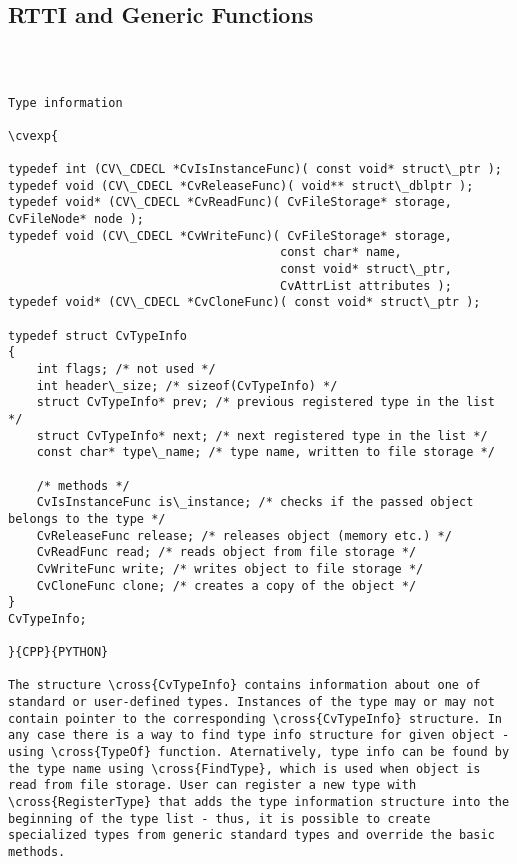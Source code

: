 \subsection{RTTI and Generic Functions}
\begin{verbatim}


\end{verbatim}
\begin{verbatim}

Type information

\cvexp{

typedef int (CV\_CDECL *CvIsInstanceFunc)( const void* struct\_ptr );
typedef void (CV\_CDECL *CvReleaseFunc)( void** struct\_dblptr );
typedef void* (CV\_CDECL *CvReadFunc)( CvFileStorage* storage, CvFileNode* node );
typedef void (CV\_CDECL *CvWriteFunc)( CvFileStorage* storage,
                                      const char* name,
                                      const void* struct\_ptr,
                                      CvAttrList attributes );
typedef void* (CV\_CDECL *CvCloneFunc)( const void* struct\_ptr );

typedef struct CvTypeInfo
{
    int flags; /* not used */
    int header\_size; /* sizeof(CvTypeInfo) */
    struct CvTypeInfo* prev; /* previous registered type in the list */
    struct CvTypeInfo* next; /* next registered type in the list */
    const char* type\_name; /* type name, written to file storage */

    /* methods */
    CvIsInstanceFunc is\_instance; /* checks if the passed object belongs to the type */
    CvReleaseFunc release; /* releases object (memory etc.) */
    CvReadFunc read; /* reads object from file storage */
    CvWriteFunc write; /* writes object to file storage */
    CvCloneFunc clone; /* creates a copy of the object */
}
CvTypeInfo;

}{CPP}{PYTHON}

The structure \cross{CvTypeInfo} contains information about one of standard or user-defined types. Instances of the type may or may not contain pointer to the corresponding \cross{CvTypeInfo} structure. In any case there is a way to find type info structure for given object - using \cross{TypeOf} function. Aternatively, type info can be found by the type name using \cross{FindType}, which is used when object is read from file storage. User can register a new type with \cross{RegisterType} that adds the type information structure into the beginning of the type list - thus, it is possible to create specialized types from generic standard types and override the basic methods.


\end{verbatim}
